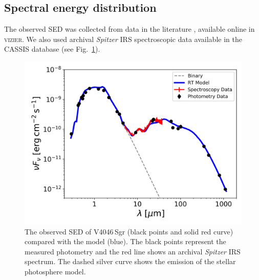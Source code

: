 \documentclass[fleqn,usenatbib,useAMS]{mnras}
\begin{document}
\subsection{Spectral energy distribution}

The observed SED was collected from data in the literature \citep{1988iras....7.....H, 1990A&A...234..230H, Jensen_97, 2000A&A...355L..27H, 2001KFNT...17..409K, 2003yCat.2246....0C, 2007PASJ...59S.369M, 2008PASP..120.1128O, 2010A&A...514A...1I, 2012yCat.2311....0C}, available online in \textsc{vizier}. We also  used  archival \textit{Spitzer} IRS spectroscopic data available in the CASSIS database \citep{Lebouteiller_2015} (see Fig.~\ref{fig:SED}). 


\begin{figure}
	\centering
	\includegraphics[width=\columnwidth]{SED_.png}
    \caption{The observed SED of V4046\,Sgr (black points and solid red curve) compared with the model (blue). The black points represent the measured photometry and the red line shows an archival \textit{Spitzer} IRS spectrum. The dashed silver curve shows the emission of the stellar photosphere model.}
    \label{fig:SED}
\end{figure}
\end{document}
